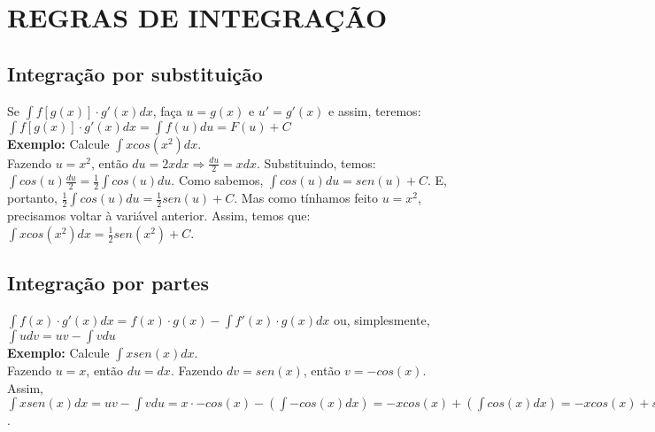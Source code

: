 \documentclass[12pt]{article}
\begin{document}
\section{REGRAS DE INTEGRAÇÃO}

\subsection{Integração por substituição}

Se $\displaystyle\int{f[g(x)] \cdot g'(x)dx}$, faça $u = g(x)$ e $u' = g'(x)$ e
assim, teremos: $\displaystyle\int{f[g(x)] \cdot g'(x)dx} =
	\displaystyle\int{f(u)du} = F(u) + C$\\[2mm]
\textbf{Exemplo:} Calcule $\displaystyle\int{xcos(x^2)dx}$.\\[2mm]
Fazendo $u = x^2$, então $du = 2xdx \Rightarrow
	\displaystyle\frac{du}{2} = xdx$.
Substituindo, temos: $\displaystyle\int{cos(u)\frac{du}{2}} =
	\frac{1}{2}\int{cos(u)du}$.
Como sabemos, $\displaystyle\int{cos(u)du} = sen(u) + C$. E, portanto,
$\displaystyle\frac{1}{2}\int{cos(u)du} = \frac{1}{2}sen(u) + C$. Mas como
tínhamos feito $u = x^2$, precisamos voltar à variável anterior. Assim, temos
que: $\displaystyle\int{xcos(x^2)dx} = \frac{1}{2}sen(x^2) + C$.

\subsection{Integração por partes}

$\displaystyle\int{f(x) \cdot g'(x)dx} =
	f(x) \cdot g(x) - \displaystyle\int{f'(x) \cdot g(x)dx}$ ou, simplesmente,
$\displaystyle\int{udv} = uv - \displaystyle\int{vdu}$\\[2mm]
\textbf{Exemplo:} Calcule $\displaystyle\int{xsen(x)dx}$.\\[2mm]
Fazendo $u = x$, então $du = dx$. Fazendo $dv = sen(x)$, então $v = -cos(x)$.
Assim, $\displaystyle\int{xsen(x)dx} = uv - \displaystyle\int{vdu} = x \cdot
	-cos(x) - \left(\displaystyle\int{-cos(x)dx}\right) = -xcos(x) +
	\left(\displaystyle\int{cos(x)dx}\right) = -xcos(x) + sen(x) + C$.
\end{document}
